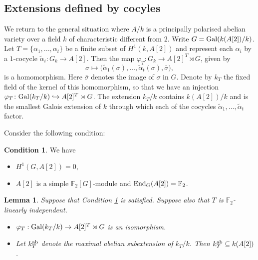 \documentclass[10pt]{amsart}
\numberwithin{equation}{section}
\newtheorem{lemma}[equation]{Lemma}
\theoremstyle{remark}
\theoremstyle{definition}
\theoremstyle{definition}
\theoremstyle{definition}
\theoremstyle{definition}
\theoremstyle{definition}
\theoremstyle{definition}
\theoremstyle{definition}
\newtheorem{condition}[equation]{Condition}
\theoremstyle{definition}
\begin{document}
 \subsection{Extensions defined by cocyles}
 We return to the general situation where $A/k$ is a principally polarised abelian variety over a field $k$ of characteristic different from $2$. Write $G=\textup{Gal}(k(A[2])/k)$. Let $T=\{\alpha_1,...,\alpha_t\}$ be a finite subset of $H^1(k,A[2])$ and represent each $\alpha_i$ by a $1$-cocycle $\tilde\alpha_i:G_k\to A[2]$. 
Then the map $\varphi_T:G_k\to A[2]^T\rtimes G$, given by %
$$\sigma\mapsto\big(\tilde\alpha_1(\sigma),\ldots,\tilde\alpha_t(\sigma),\bar{\sigma}\big),$$
is a homomorphism. Here $\bar{\sigma}$ denotes the image of $\sigma$ in $G$.   
Denote by $k_T$ the fixed field of the kernel of this homomorphism, so that 
we have an injection $\varphi_T\colon\textup{Gal}(k_T/k)\hookrightarrow A[2]^T\rtimes G$.  %
The extension $k_T/k$  contains $k(A[2])/k$ and is the smallest Galois extension of $k$ through which each of the cocycles $\tilde\alpha_1,\ldots,\tilde\alpha_t$ factor.   

Consider the following condition:

\begin{condition} \label{cond:simple}
We have 
\begin{itemize}
\item[(a)] $H^1(G,A[2])=0$,
\item[(b)] $A[2]$ is a simple $\mathbb{F}_2[G]$-module and $\textup{End}_{G}(A[2])=\mathbb{F}_2$. 
\end{itemize} 
\end{condition}

\begin{lemma} \label{semidirect_product_lem}
Suppose that Condition \ref{cond:simple} is satisfied. Suppose also that $T$ is $\mathbb{F}_2$-linearly independent. 
\begin{itemize}
\item[(i)] $\varphi_T:\textup{Gal}(k_T/k)\to A[2]^T\rtimes G$ is an isomorphism. 
\item[(ii)] Let $k_T^{\textup{ab}}$ denote the maximal abelian subextension of $k_T/k$. Then $k_T^{\textup{ab}}\subseteq k(A[2])$.
\end{itemize}
\end{lemma}
\end{document}
